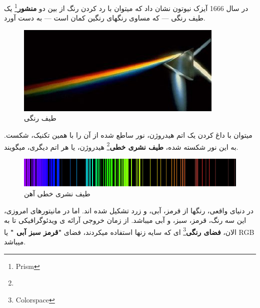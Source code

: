 \documentclass[14pt,a4paper]{memoir}
\begin{document}
در سال 1666 آیزک نیوتون نشان داد که میتوان با رد کردن رنگ از بین دو \textbf{منشور}\footnote{Prism} یک طیف رنگی --- که مساوی رنگهای رنگین کمان است --- به دست آورد.

\begin{figure}[H]
	\centering
	\includegraphics[scale=1]{Prism}
	\caption{طیف رنگی}
\end{figure}

میتوان با داغ کردن یک اتم هیدروژن، نور ساطع شده از آن را با همین تکنیک، شکست. به این نور شکسته شده، \textbf{طیف نشری خطی}\footnote{} هیدروژن، یا هر اتم دیگری، میگویند.


\begin{figure}[H]
	\centering
	\includegraphics[scale=0.4]{IronSpectrum}
	\caption{طیف نشری خطی آهن}
\end{figure}


در دنیای واقعی، رنگها از قرمز، آبی، و زرد تشکیل شده اند. اما در مانیتورهای امروزی، این سه رنگ، قرمز، سبز، و آبی میباشد. از زمان خروجی آرائه ی ویدئوگرافیکی تا به الان، \textbf{فضای رنگی}\footnote{Colorspace} ای که سایه زنها استفاده میکردند، فضای \textbf{"قرمز سبز آبی "} یا RGB میباشد. 
\end{document}
